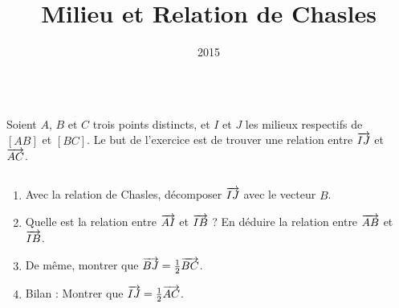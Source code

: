 \documentclass[14pt, aspectratio=43]{beamer}
\institute{Lycée Marie Curie}
\date{2015}
\title{Milieu et Relation de Chasles}
\begin{document}
\begin{frame}
  \begin{columns}
    \begin{column}{.5\textwidth}
      Soient $A$, $B$ et $C$ trois points distincts, et $I$ et $J$ les milieux respectifs de $\left[ AB \right]$ et $\left[ BC \right]$. Le but de l'exercice est de trouver une relation entre $\overrightarrow{IJ}$ et $\overrightarrow{AC}$.
    \end{column}
    \begin{column}{.5\textwidth}
      \begin{center}
      \end{center}
    \end{column}
  \end{columns}

  \begin{enumerate}
    \item Avec la relation de Chasles, décomposer $\overrightarrow{IJ}$ avec le vecteur $B$.
    \item Quelle est la relation entre $\overrightarrow{AI}$ et $\overrightarrow{IB}$ ? En déduire la relation entre $\overrightarrow{AB}$ et $\overrightarrow{IB}$.
    \item De même, montrer que $\overrightarrow{BJ}=\frac{1}{2}\overrightarrow{BC}$.
    \item Bilan : Montrer que $\overrightarrow{IJ}=\frac{1}{2}\overrightarrow{AC}$.
  \end{enumerate}

\end{frame}
\end{document}
